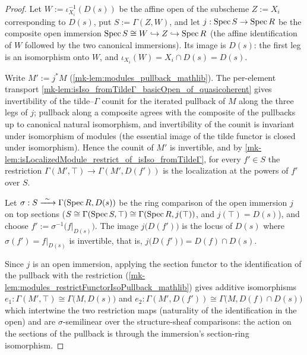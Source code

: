 \begin{proof}
  \leanok
  Let \(W := \iota_{X_i}^{-1}(D(s))\) be the affine open of the subscheme \(Z := X_i\)
  corresponding to \(D(s)\), put \(S := \Gamma(Z, W)\), and let
  \(j : \operatorname{Spec} S \to \operatorname{Spec} R\) be the composite open immersion
  \(\operatorname{Spec} S \cong W \hookrightarrow Z \hookrightarrow \operatorname{Spec} R\) (the affine
  identification of \(W\) followed by the two canonical immersions). Its image is
  \(D(s)\): the first leg is an isomorphism onto \(W\), and
  \(\iota_{X_i}(W) = X_i \cap D(s) = D(s)\).

  Write \(M' := j^{*} M\) (\ref{mk-lem:modules_pullback_mathlib}). The per-element
  transport \ref{mk-lem:isIso_fromTildeΓ_basicOpen_of_quasicoherent} gives invertibility of
  the tilde--\(\Gamma\) counit for the iterated pullback of \(M\) along the three legs of
  \(j\); pullback along a composite agrees with the composite of the pullbacks up to
  canonical natural isomorphism, and invertibility of the counit is invariant under
  isomorphism of modules (the essential image of the tilde functor is closed under
  isomorphism). Hence the counit of \(M'\) is invertible, and by
  \ref{mk-lem:isLocalizedModule_restrict_of_isIso_fromTildeΓ}, for every \(f' \in S\) the
  restriction \(\Gamma(M', \top) \to \Gamma(M', D(f'))\) is the localization at the
  powers of \(f'\) over \(S\).

  Let \(\sigma : S \xrightarrow{\ \sim\ } \Gamma(\operatorname{Spec} R, D(s))\) be the ring comparison
  of the open immersion \(j\) on top sections
  (\(S \cong \Gamma(\operatorname{Spec} S, \top) \cong \Gamma(\operatorname{Spec} R, j(\top))\), and
  \(j(\top) = D(s)\)), and choose \(f' := \sigma^{-1}\bigl(f|_{D(s)}\bigr)\). The image
  \(j\bigl(D(f')\bigr)\) is the locus of \(D(s)\) where \(\sigma(f') = f|_{D(s)}\) is
  invertible, that is, \(j\bigl(D(f')\bigr) = D(f) \cap D(s)\).

  Since \(j\) is an open immersion, applying the section functor to the identification of
  the pullback with the restriction (\ref{mk-lem:modules_restrictFunctorIsoPullback_mathlib})
  gives additive isomorphisms
  \(e_1 : \Gamma(M', \top) \cong \Gamma\bigl(M, D(s)\bigr)\) and
  \(e_2 : \Gamma(M', D(f')) \cong \Gamma\bigl(M, D(f) \cap D(s)\bigr)\) which intertwine
  the two restriction maps (naturality of the identification in the open) and are
  \(\sigma\)-semilinear over the structure-sheaf comparisons: the action on the sections
  of the pullback is through the immersion's section-ring isomorphism.


\end{proof}
